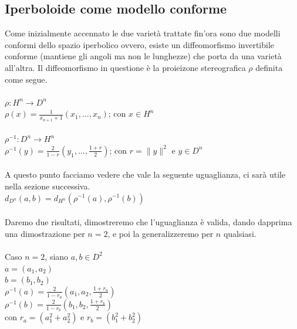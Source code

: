 \documentclass[a4paper, 12pt]{article}
\begin{document}
\subsection{Iperboloide come modello conforme}
Come inizialmente accennato le due varietà trattate fin'ora sono due modelli conformi dello spazio iperbolico ovvero, esiste un diffeomorfismo invertibile conforme (mantiene gli angoli ma non le lunghezze) che porta da una varietà all'altra. Il diffeomorfismo in questione è la proieizone stereografica $\rho$ definita come segue.\\\\
$\rho : H^n \to D^n$\\
$\rho(x) = \frac{1}{x_{n+1} + 1}(x_1, ..., x_n)$; con $x \in H^n$\\\\
$\rho^{-1} : D^n \to H^n$\\
$\rho^{-1}(y) = \frac{2}{1 - r}(y_1, ..., \frac{1+r}{2})$; con $r = \parallel y \parallel^2$ e $y \in D^n$\\\\
A questo punto facciamo vedere che vale la seguente uguaglianza, ci sarà utile nella sezione successiva.\\
$d_{D^n}(a, b) = d_{H^n}(\rho^{-1}(a), \rho^{-1}(b))$\\\\
Daremo due risultati, dimostreremo che l'uguaglianza è valida, dando dapprima una dimostrazione per $n = 2$, e poi la generalizzeremo per $n$ qualsiasi.\\\\
Caso $n=2$, siano $a, b \in D^2$\\
$a = (a_1, a_2)$\\
$b = (b_1, b_2)$\\
$\rho^{-1}(a) = \frac{2}{1-r_a}(a_1, a_2, \frac{1 + r_a}{2})$\\
$\rho^{-1}(b) = \frac{2}{1-r_b}(b_1, b_2, \frac{1 + r_b}{2})$\\
con $r_a = (a_1^2 + a_2^2)$ e $r_b = (b_1^2 + b_2^2)$\\\\
\end{document}
